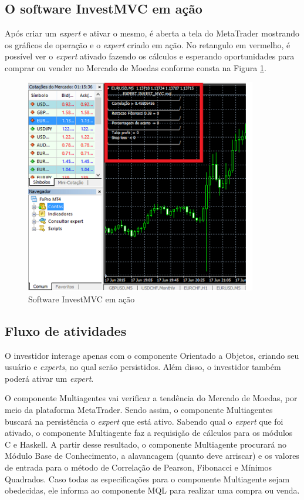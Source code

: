 \subsection{O software InvestMVC em ação}
Após criar um \textit{expert} e ativar o mesmo, é aberta a tela do MetaTrader mostrando os gráficos de operação e o \textit{expert} criado em ação. No retangulo em vermelho, é possível ver o \textit{expert} ativado fazendo os cálculos e esperando oportunidades para comprar ou vender no Mercado de Moedas conforme consta na Figura \ref{wine}.

\begin{figure}[H]
\centering
\includegraphics[width=0.9\textwidth]{figuras/wine}
\caption{Software InvestMVC em ação}
\label{wine}
\end{figure}

\subsection{Fluxo de atividades}
O investidor interage apenas com o componente Orientado a Objetos, criando seu usuário e \textit{experts}, no qual serão persistidos. Além disso, o investidor também poderá ativar um \textit{expert}.

O componente Multiagentes vai verificar a tendência do Mercado de Moedas, por meio da plataforma MetaTrader. Sendo assim, o componente Multiagentes buscará na persistência o \textit{expert} que está ativo. Sabendo qual o \textit{expert} que foi ativado, o componente Multiagente faz a requisição de cálculos para os módulos C e Haskell. A partir desse resultado, o componente Multiagente procurará no Módulo Base de Conhecimento, a alavancagem (quanto deve arriscar) e os valores de entrada para o método de Correlação de Pearson, Fibonacci e Mínimos Quadrados. Caso todas as especificações para o componente Multiagente sejam obedecidas, ele informa ao componente MQL para realizar uma compra ou venda.

